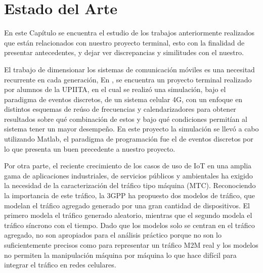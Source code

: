 \chapter{Estado del Arte}
\label{Chapter3} %

En este Capítulo se encuentra el estudio de los trabajos anteriormente realizados que están relacionados con nuestro proyecto terminal, esto con la finalidad de presentar antecedentes, y dejar ver discrepancias y similitudes con el nuestro.\newline

El trabajo de dimensionar los sistemas de comunicación móviles es una necesitad recurrente en cada generación, En \parencite{Celis2016}, se encuentra un proyecto terminal realizado por alumnos de la UPIITA, en el cual se realizó una simulación, bajo el paradigma de eventos discretos, de un sistema celular 4G, con un enfoque en distintos esquemas de reúso de frecuencias y calendarizadores para obtener resultados sobre qué combinación de estos y bajo qué condiciones permitían al sistema tener un mayor desempeño. En este proyecto la simulación se llevó a cabo utilizando Matlab, el paradigma de programación fue el de eventos discretos por lo que presenta un buen precedente a nuestro proyecto.\newline

Por otra parte, el reciente crecimiento de los casos de uso de IoT en una amplia gama de aplicaciones industriales, de servicios públicos y ambientales ha exigido la necesidad de la caracterización del tráfico tipo máquina (MTC). Reconociendo la importancia de este tráfico, la 3GPP ha propuesto dos modelos de tráfico, que modelan el tráfico agregado generado por una gran cantidad de dispositivos. El primero modela el tráfico generado aleatorio, mientras que el segundo modela el tráfico síncrono con el tiempo. Dado que los modelos solo se centran en el tráfico agregado, no son apropiados para el análisis práctico porque no son lo suficientemente precisos como para representar un tráfico M2M real y los modelos no permiten la manipulación máquina por máquina lo que hace difícil para integrar el tráfico en redes celulares.\newline


